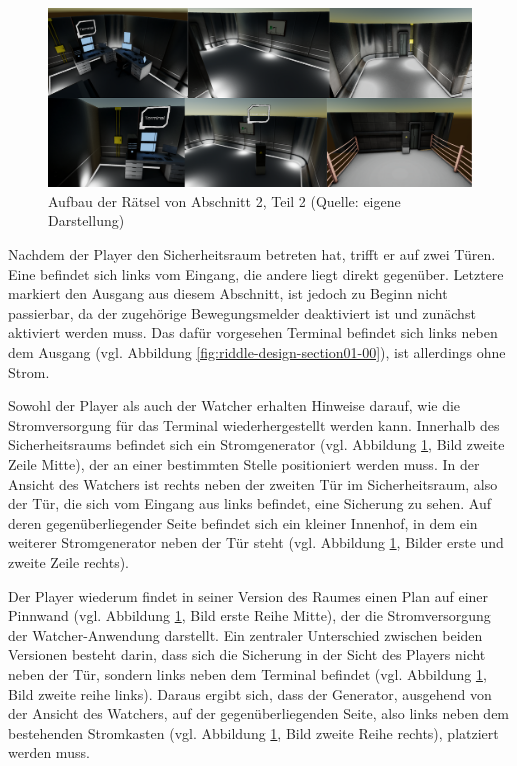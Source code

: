 \begin{figure}[ht]
\centering
\includegraphics[width=1\linewidth]{content/pictures/Rätseldesign - Abschnitt01 - Rätsel01.png}
\caption{Aufbau der Rätsel von Abschnitt 2, Teil 2 (Quelle: eigene Darstellung)}
\label{fig:riddle-design-section01-01}
\end{figure}

Nachdem der Player den Sicherheitsraum betreten hat, trifft er auf zwei Türen. Eine befindet sich links vom Eingang, die andere liegt direkt gegenüber. Letztere markiert den Ausgang aus diesem Abschnitt, ist jedoch zu Beginn nicht passierbar, da der zugehörige Bewegungsmelder deaktiviert ist und zunächst aktiviert werden muss. Das dafür vorgesehen Terminal befindet sich links neben dem Ausgang (vgl. Abbildung \ref{fig:riddle-design-section01-00}), ist allerdings ohne Strom.

Sowohl der Player als auch der Watcher erhalten Hinweise darauf, wie die Stromversorgung für das Terminal wiederhergestellt werden kann. Innerhalb des Sicherheitsraums befindet sich ein Stromgenerator (vgl. Abbildung \ref{fig:riddle-design-section01-01}, Bild zweite Zeile Mitte), der an einer bestimmten Stelle positioniert werden muss. In der Ansicht des Watchers ist rechts neben der zweiten Tür im Sicherheitsraum, also der Tür, die sich vom Eingang aus links befindet, eine Sicherung zu sehen. Auf deren gegenüberliegender Seite befindet sich ein kleiner Innenhof, in dem ein weiterer Stromgenerator neben der Tür steht (vgl. Abbildung \ref{fig:riddle-design-section01-01}, Bilder erste und zweite Zeile rechts).

Der Player wiederum findet in seiner Version des Raumes einen Plan auf einer Pinnwand (vgl. Abbildung \ref{fig:riddle-design-section01-01}, Bild erste Reihe Mitte), der die Stromversorgung der Watcher-Anwendung darstellt. Ein zentraler Unterschied zwischen beiden Versionen besteht darin, dass sich die Sicherung in der Sicht des Players nicht neben der Tür, sondern links neben dem Terminal befindet (vgl. Abbildung \ref{fig:riddle-design-section01-01}, Bild zweite reihe links). Daraus ergibt sich, dass der Generator, ausgehend von der Ansicht des Watchers, auf der gegenüberliegenden Seite, also links neben dem bestehenden Stromkasten (vgl. Abbildung \ref{fig:riddle-design-section01-01}, Bild zweite Reihe rechts), platziert werden muss.


